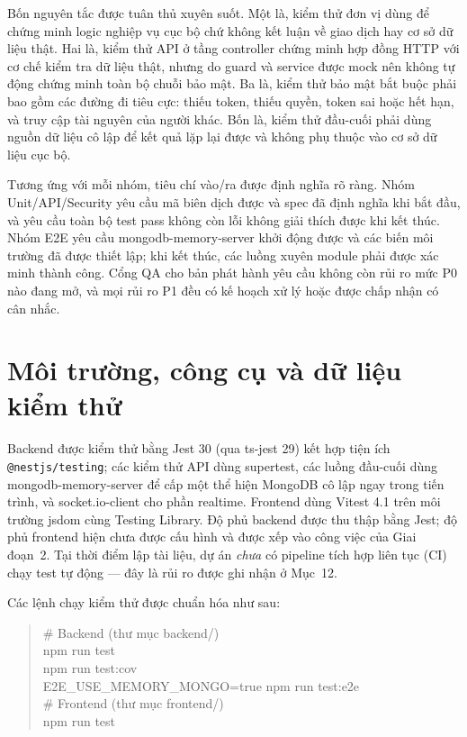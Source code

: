 \documentclass[12pt,a4paper]{article}
\newcommand{\code}[1]{\texttt{#1}}
\begin{document}
Bốn nguyên tắc được tuân thủ xuyên suốt. Một là, kiểm thử đơn vị dùng để chứng minh logic nghiệp vụ cục bộ
chứ không kết luận về giao dịch hay cơ sở dữ liệu thật. Hai là, kiểm thử API ở tầng controller chứng minh
hợp đồng HTTP với cơ chế kiểm tra dữ liệu thật, nhưng do guard và service được mock nên không tự động chứng
minh toàn bộ chuỗi bảo mật. Ba là, kiểm thử bảo mật bắt buộc phải bao gồm các đường đi tiêu cực: thiếu
token, thiếu quyền, token sai hoặc hết hạn, và truy cập tài nguyên của người khác. Bốn là, kiểm thử
đầu-cuối phải dùng nguồn dữ liệu cô lập để kết quả lặp lại được và không phụ thuộc vào cơ sở dữ liệu cục bộ.

Tương ứng với mỗi nhóm, tiêu chí vào/ra được định nghĩa rõ ràng. Nhóm Unit/API/Security yêu cầu mã biên dịch
được và spec đã định nghĩa khi bắt đầu, và yêu cầu toàn bộ test pass không còn lỗi không giải thích được khi
kết thúc. Nhóm E2E yêu cầu mongodb-memory-server khởi động được và các biến môi trường đã được thiết lập;
khi kết thúc, các luồng xuyên module phải được xác minh thành công. Cổng QA cho bản phát hành yêu cầu không
còn rủi ro mức P0 nào đang mở, và mọi rủi ro P1 đều có kế hoạch xử lý hoặc được chấp nhận có cân nhắc.

\section{Môi trường, công cụ và dữ liệu kiểm thử}

Backend được kiểm thử bằng Jest 30 (qua ts-jest 29) kết hợp tiện ích \code{@nestjs/testing}; các kiểm thử
API dùng supertest, các luồng đầu-cuối dùng mongodb-memory-server để cấp một thể hiện MongoDB cô lập ngay
trong tiến trình, và socket.io-client cho phần realtime. Frontend dùng Vitest 4.1 trên môi trường jsdom
cùng Testing Library. Độ phủ backend được thu thập bằng Jest; độ phủ frontend hiện chưa được cấu hình và
được xếp vào công việc của Giai đoạn~2. Tại thời điểm lập tài liệu, dự án \emph{chưa} có pipeline tích hợp
liên tục (CI) chạy test tự động --- đây là rủi ro được ghi nhận ở Mục~12.

Các lệnh chạy kiểm thử được chuẩn hóa như sau:

\begin{quote}\ttfamily\small
\# Backend (thư mục backend/)\\
npm run test\\
npm run test:cov\\
E2E\_USE\_MEMORY\_MONGO=true npm run test:e2e\\[4pt]
\# Frontend (thư mục frontend/)\\
npm run test
\end{quote}
\end{document}
